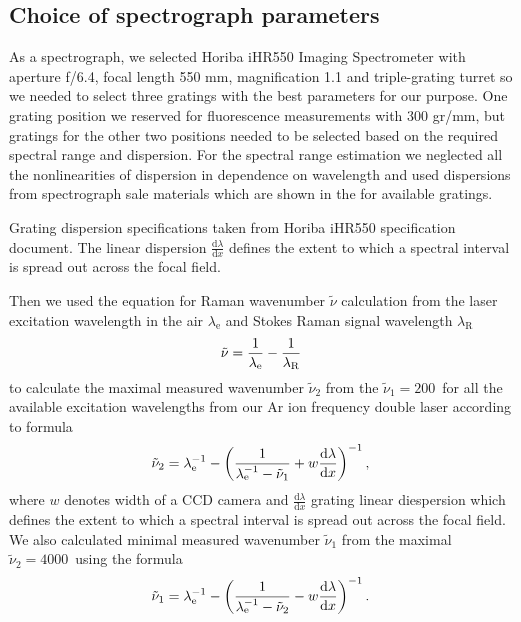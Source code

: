 \subsection{Choice of spectrograph parameters}

As a spectrograph, we selected Horiba iHR550 Imaging Spectrometer with aperture
f/6.4, focal length 550 mm, magnification 1.1 and triple-grating turret so we
needed to select three gratings with the best parameters for our purpose. One
grating position we reserved for fluorescence measurements with 300 gr/mm, but
gratings for the other two positions needed to be selected based on the
required spectral range and dispersion. For the spectral range estimation
we neglected all the nonlinearities of dispersion in dependence on wavelength
and used dispersions from spectrograph sale materials which are shown in the
for available gratings.

\begin{table}
	\centering
	
	\caption{Grating dispersion specifications taken from Horiba iHR550
		specification document. The linear dispersion
		$\frac{\text{d}\lambda}{\text{d}x}$ defines the extent to which a spectral
		interval is spread out across the focal field.}
	\label{\tablabel{spectrograph_selection:dispersion_spec}}
\end{table}

Then we used the equation for Raman wavenumber $\tilde{\nu}$ calculation from
the laser excitation wavelength in the air $\lambda_\text{e}$ and Stokes Raman
signal wavelength $\lambda_\text{R}$
\begin{equation}
	\tilde{\nu} = \frac{1}{\lambda_\text{e}} - \frac{1}{\lambda_\text{R}}
	\label{\eqnlabel{spectrograph_selection:nu}}
\end{equation}
to calculate the maximal measured wavenumber $\tilde{\nu}_2$ from the
$\tilde{\nu}_1 = 200$\,\icm{} for all the available excitation wavelengths
from our Ar ion frequency double laser according to formula
\begin{equation}
	\tilde{\nu}_2 = \lambda_\text{e}^{-1}
		- \left(\frac{1}{\lambda_\text{e}^{-1} - \tilde{\nu}_1}
			+ w\frac{\text{d}\lambda}{\text{d}x}\right)^{-1},
	\label{\eqnlabel{spectrograph_selection:spectral_range_max_est}}
\end{equation}
where $w$ denotes width of a CCD camera and $\frac{\text{d}\lambda}{\text{d}x}$
grating linear diespersion which defines the extent to which a spectral
interval is spread out across the focal field. We also calculated minimal
measured wavenumber $\tilde{\nu}_1$ from the maximal
$\tilde{\nu}_2 = 4000$\,\icm{} using the formula
\begin{equation}
	\tilde{\nu}_1 = \lambda_\text{e}^{-1}
		- \left(\frac{1}{\lambda_\text{e}^{-1} - \tilde{\nu}_2}
			- w\frac{\text{d}\lambda}{\text{d}x}\right)^{-1}.
	\label{\eqnlabel{spectrograph_selection:spectral_range_min_est}}
\end{equation}

